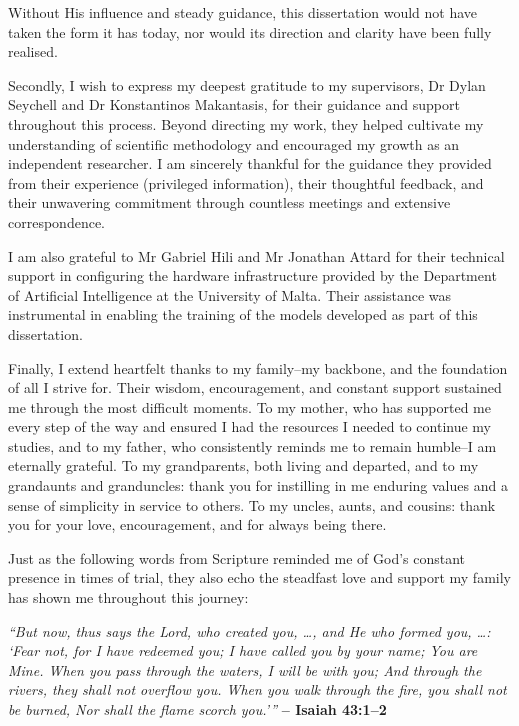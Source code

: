 \bigskip\bigskip

\noindent Without His influence and steady guidance, this dissertation would not have taken the form it has today, nor would its direction and clarity have been fully realised.

\bigskip

\noindent Secondly, I wish to express my deepest gratitude to my supervisors, Dr Dylan Seychell and Dr Konstantinos Makantasis, for their guidance and support throughout this process. Beyond directing my work, they helped cultivate my understanding of scientific methodology and encouraged my growth as an independent researcher. I am sincerely thankful for the guidance they provided from their experience (privileged information), their thoughtful feedback, and their unwavering commitment through countless meetings and extensive correspondence.

\bigskip

\noindent I am also grateful to Mr Gabriel Hili and Mr Jonathan Attard for their technical support in configuring the hardware infrastructure provided by the Department of Artificial Intelligence at the University of Malta. Their assistance was instrumental in enabling the training of the models developed as part of this dissertation.

\bigskip

\noindent Finally, I extend heartfelt thanks to my family--my backbone, and the foundation of all I strive for. Their wisdom, encouragement, and constant support sustained me through the most difficult moments. To my mother, who has supported me every step of the way and ensured I had the resources I needed to continue my studies, and to my father, who consistently reminds me to remain humble--I am eternally grateful. To my grandparents, both living and departed, and to my grandaunts and granduncles: thank you for instilling in me enduring values and a sense of simplicity in service to others. To my uncles, aunts, and cousins: thank you for your love, encouragement, and for always being there.

\bigskip

\noindent Just as the following words from Scripture reminded me of God’s constant presence in times of trial, they also echo the steadfast love and support my family has shown me throughout this journey:

\bigskip\bigskip

\noindent
\textit{``But now, thus says the Lord, who created you, \ldots, and He who formed you, \ldots : ‘Fear not, for I have redeemed you; I have called you by your name; You are Mine. When you pass through the waters, I will be with you; And through the rivers, they shall not overflow you. When you walk through the fire, you shall not be burned, Nor shall the flame scorch you.’''} \textbf{-- Isaiah 43:1–2}

